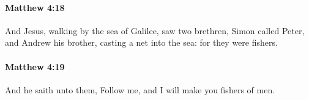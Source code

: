 		\paragraph{Matthew 4:18} %
			\label{MATTHEW-4-18}

			And Jesus, walking by the sea of Galilee, saw two brethren, Simon called Peter, and Andrew his brother, casting a net into the sea: for they were fishers.

			\begin{framed}
			\scriptsize
				\begin{compactdesc}
					\item[SBLG] 
				\end{compactdesc}
			\end{framed}

		\paragraph{Matthew 4:19} %
			\label{MATTHEW-4-19}

			And he saith unto them, Follow me, and I will make you fishers of men.

